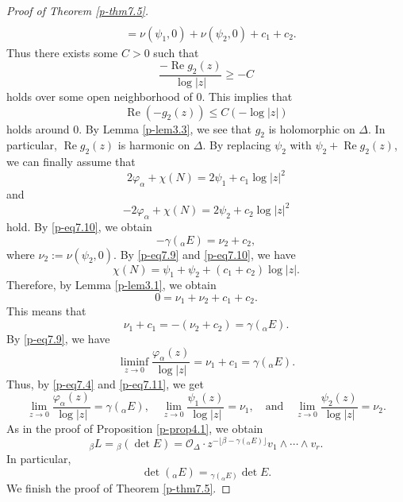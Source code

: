 \documentclass[10pt,a4paper]{amsart}
\DeclareMathOperator{\re}{Re}
\begin{document}
\begin{proof}[Proof of Theorem \ref{p-thm7.5}]
\[\begin{split}
\\ &=\nu(\psi_1, 0)+\nu(\psi_2, 0)+c_1+c_2. 
\end{split}
\] 
Thus there exists some $C>0$ such that 
\[
\frac{-\re g_2(z)}{\log |z|}\geq -C
\] 
holds over some open neighborhood of $0$. 
This implies that 
\[
\re\left(-g_2(z)\right)\leq C\left(-\log |z|\right)
\] 
holds around $0$. 
By Lemma \ref{p-lem3.3}, we see that 
$g_2$ is holomorphic on $\Delta$. 
In particular, $\re g_2(z)$ is harmonic on $\Delta$. 
By replacing $\psi_2$ with $\psi_2 +\re g_2(z)$, we can finally assume that 
\begin{equation}\label{p-eq7.9}
2\varphi_\alpha +\chi (N)=2\psi_1+c_1\log |z|^2
\end{equation}
and 
\begin{equation}\label{p-eq7.10}
-2\varphi_\alpha +\chi (N)=2\psi_2+c_2\log |z|^2
\end{equation} 
hold. 
By \eqref{p-eq7.10}, we obtain 
\[
-\gamma ({}_\alpha E)=\nu_2+c_2,  
\] 
where $\nu_2:=\nu(\psi_2, 0)$. 
By \eqref{p-eq7.9} and \eqref{p-eq7.10}, we have 
\[
\chi (N)=\psi_1+\psi_2+(c_1+c_2)\log |z|. 
\] 
Therefore, by Lemma \ref{p-lem3.1}, we obtain 
\[
0=\nu_1+\nu_2+c_1+c_2. 
\] 
This means that 
\[\nu _1+c_1=-(\nu_2+c_2)=\gamma ({}_\alpha E). 
\]
By \eqref{p-eq7.9}, 
we have 
\begin{equation}\label{p-eq7.11}
\liminf_{z\to 0} \frac{\varphi_\alpha(z)}{\log |z|}=\nu_1+c_1 =
\gamma ({}_\alpha E).   
\end{equation} 
Thus, by \eqref{p-eq7.4} and \eqref{p-eq7.11}, we get 
\[
\lim_{z\to 0} \frac{\varphi_\alpha(z)}{\log |z|}=
\gamma ({}_\alpha E), \quad \lim _{z\to 0} \frac{\psi_1(z)}{\log |z|}=\nu_1, 
\quad \text{and}\quad 
\lim _{z\to 0} \frac{\psi_2(z)}{\log |z|}=\nu_2.  
\] 
As in the proof of Proposition \ref{p-prop4.1}, we obtain 
\begin{equation}\label{p-eq7.12}
{}_\beta L={}_\beta (\det E)=\mathcal O_{\Delta} \cdot 
z^{-\lfloor \beta -\gamma ({}_\alpha E)\rfloor}v_1\wedge \cdots 
\wedge v_r. 
\end{equation} 
In particular, 
\[
\det ({}_\alpha E)={}_{\gamma ({}_\alpha E)}\det E. 
\] 
We finish the proof of Theorem \ref{p-thm7.5}. 
\end{proof}
\end{document}
